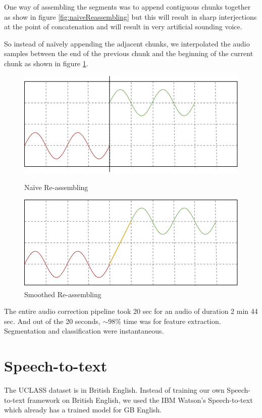 \documentclass{report}
\begin{document}
One way of assembling the segments was to append contiguous chunks together as show in figure \ref{fig:naiveReassembling} but this will result in sharp interjections at the point of concatenation and will result in very artificial sounding voice.

So instead of na\"ively appending the adjacent chunks, we interpolated the audio samples between the end of the previous chunk and the beginning of the current chunk as shown in figure \ref{fig:smoothedReassembling}.

\begin{figure}[!ht]
    \centering
    \includegraphics[scale=0.8]{NaiveReassembling.pdf}
    \caption{Na\"ive Re-assembling}
    \label{fig:naiveReassembling}
    
    \includegraphics[scale=0.8]{SmoothReassembling.pdf}
    \caption{Smoothed Re-assembling}
    \label{fig:smoothedReassembling}
\end{figure}

The entire audio correction pipeline took 20 sec for an audio of duration 2 min 44 sec. And out of the 20 seconds, $\sim$98\% time \label{correctionDuration} was for feature extraction. Segmentation and classification were instantaneous.

\section{Speech-to-text}
The UCLASS dataset \cite{uclass} is in British English. Instead of training our own Speech-to-text framework on British English, we used the IBM Watson's Speech-to-text \cite{speechToText} which already has a trained model for GB English.
\end{document}

